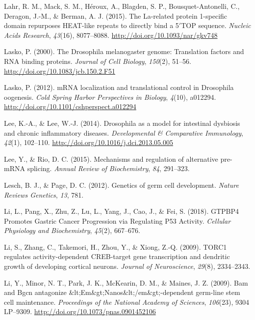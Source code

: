 \documentclass[12pt,twoside]{reedthesis}
\newlength{\cslhangindent}
\newenvironment{cslreferences}%
  {\setlength{\parindent}{0pt}%
  \everypar{\setlength{\hangindent}{\cslhangindent}}\ignorespaces}%
  {\par}
\begin{document}
\begin{cslreferences}
\leavevmode\hypertarget{ref-lahrLarelatedProtein1specific2015}{}%
Lahr, R. M., Mack, S. M., Héroux, A., Blagden, S. P., Bousquet-Antonelli, C., Deragon, J.-M., \& Berman, A. J. (2015). The La-related protein 1-specific domain repurposes HEAT-like repeats to directly bind a 5\({'}\)TOP sequence. \emph{Nucleic Acids Research}, \emph{43}(16), 8077--8088. \url{http://doi.org/10.1093/nar/gkv748}

\leavevmode\hypertarget{ref-Lasko2000}{}%
Lasko, P. (2000). The Drosophila melanogaster genome: Translation factors and RNA binding proteins. \emph{Journal of Cell Biology}, \emph{150}(2), 51--56. \url{http://doi.org/10.1083/jcb.150.2.F51}

\leavevmode\hypertarget{ref-Lasko2012a}{}%
Lasko, P. (2012). mRNA localization and translational control in Drosophila oogenesis. \emph{Cold Spring Harbor Perspectives in Biology}, \emph{4}(10), a012294. \url{http://doi.org/10.1101/cshperspect.a012294}

\leavevmode\hypertarget{ref-Lee2014c}{}%
Lee, K.-A., \& Lee, W.-J. (2014). Drosophila as a model for intestinal dysbiosis and chronic inflammatory diseases. \emph{Developmental \& Comparative Immunology}, \emph{42}(1), 102--110. \url{http://doi.org/10.1016/j.dci.2013.05.005}

\leavevmode\hypertarget{ref-Lee2015}{}%
Lee, Y., \& Rio, D. C. (2015). Mechanisms and regulation of alternative pre-mRNA splicing. \emph{Annual Review of Biochemistry}, \emph{84}, 291--323.

\leavevmode\hypertarget{ref-Lesch2012b}{}%
Lesch, B. J., \& Page, D. C. (2012). Genetics of germ cell development. \emph{Nature Reviews Genetics}, \emph{13}, 781.

\leavevmode\hypertarget{ref-Li2018a}{}%
Li, L., Pang, X., Zhu, Z., Lu, L., Yang, J., Cao, J., \& Fei, S. (2018). GTPBP4 Promotes Gastric Cancer Progression via Regulating P53 Activity. \emph{Cellular Physiology and Biochemistry}, \emph{45}(2), 667--676.

\leavevmode\hypertarget{ref-Li2009n}{}%
Li, S., Zhang, C., Takemori, H., Zhou, Y., \& Xiong, Z.-Q. (2009). TORC1 regulates activity-dependent CREB-target gene transcription and dendritic growth of developing cortical neurons. \emph{Journal of Neuroscience}, \emph{29}(8), 2334--2343.

\leavevmode\hypertarget{ref-Li2009h}{}%
Li, Y., Minor, N. T., Park, J. K., McKearin, D. M., \& Maines, J. Z. (2009). Bam and Bgcn antagonize \&lt;Em\&gt;Nanos\&lt;/em\&gt;-dependent germ-line stem cell maintenance. \emph{Proceedings of the National Academy of Sciences}, \emph{106}(23), 9304 LP--9309. \url{http://doi.org/10.1073/pnas.0901452106}


\end{cslreferences}
\end{document}
